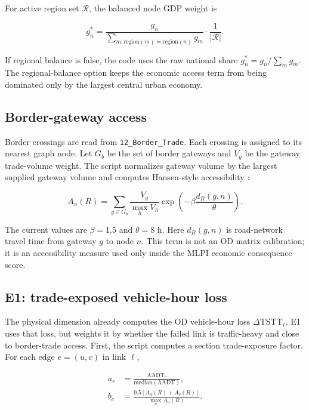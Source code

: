 \documentclass[11pt,a4paper]{article}
\begin{document}
For active region set $\mathcal{R}$, the balanced node GDP weight is

\begin{equation}
g^{*}_n=
\frac{g_n}
{\sum_{m:\mathrm{region}(m)=\mathrm{region}(n)}g_m}
\cdot
\frac{1}{|\mathcal{R}|}.
\label{eq:mlpi-balanced-gdp}
\end{equation}

If regional balance is false, the code uses the raw national share
$g^{*}_n=g_n/\sum_m g_m$. The regional-balance option keeps the economic access
term from being dominated only by the largest central urban economy.

\subsection{Border-gateway access}

Border crossings are read from \texttt{12\_Border\_Trade}. Each crossing is
assigned to its nearest graph node. Let $G_b$ be the set of border gateways and
$V_g$ be the gateway trade-volume weight. The script normalizes gateway volume
by the largest supplied gateway volume and computes Hansen-style accessibility
\cite{hansen1959}:

\begin{equation}
A_n(R)
=\sum_{g\in G_b}
\frac{V_g}{\max_h V_h}
\exp\left(-\beta\frac{d_R(g,n)}{\theta}\right).
\label{eq:mlpi-border-access}
\end{equation}

The current values are $\beta=1.5$ and $\theta=8$ h. Here $d_R(g,n)$ is
road-network travel time from gateway $g$ to node $n$. This term is not an OD
matrix calibration; it is an accessibility measure used only inside the MLPI
economic consequence score.

\subsection{E1: trade-exposed vehicle-hour loss}

The physical dimension already computes the OD vehicle-hour loss
$\Delta \mathrm{TSTT}_{\ell}$. E1 uses that loss, but weights it by whether the
failed link is traffic-heavy and close to border-trade access. First, the
script computes a section trade-exposure factor. For each edge $e=(u,v)$ in
link $\ell$,

\begin{align}
a_e &= \frac{\mathrm{AADT}_e}{\mathrm{median}(\mathrm{AADT})},\\
b_e &= \frac{0.5[A_u(R)+A_v(R)]}{\max_n A_n(R)}.
\end{align}
\end{document}
